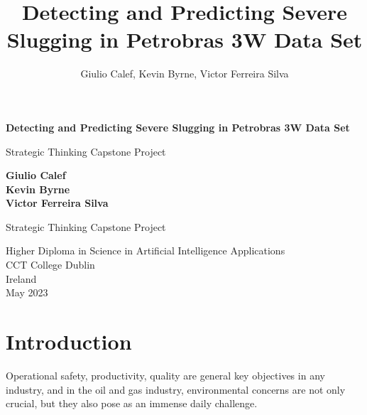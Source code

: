 \documentclass{article}
\begin{document}
\begin{titlepage}
   \begin{center}
       \vspace*{1cm}

       \textbf{Detecting and Predicting Severe Slugging in Petrobras 3W Data Set}

       \vspace{0.5cm}
        Strategic Thinking Capstone Project
            
       \vspace{1.5cm}

       \textbf{Giulio Calef} \\
       \textbf{Kevin Byrne} \\
       \textbf{Victor Ferreira Silva} \\

       \vfill
            
       Strategic Thinking Capstone Project
            
       \vspace{0.8cm}
     
            
       Higher Diploma in Science in Artificial Intelligence Applications\\
       CCT College Dublin\\
       Ireland\\
       May 2023
            
   \end{center}
\end{titlepage}

\title{Detecting and Predicting Severe Slugging in Petrobras 3W Data Set}

\author{Giulio Calef, Kevin Byrne, Victor Ferreira Silva}
\tableofcontents

\maketitle

\section{Introduction}

Operational safety, productivity, quality are general key objectives in any industry, and in the oil and gas industry, environmental concerns are not only crucial, but they also pose as an immense daily challenge. 
\end{document}
